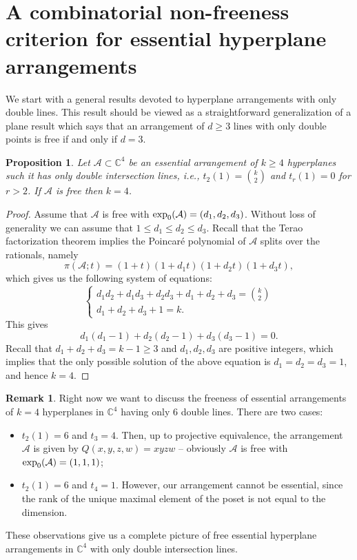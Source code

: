 \documentclass[11pt]{article}
\theoremstyle{plain}
\newtheorem{proposition}[thm]{Proposition}
\theoremstyle{definition}
\newtheorem{remark}[thm]{Remark}
\begin{document}
\section{A combinatorial non-freeness criterion for essential hyperplane arrangements}
We start with a general results devoted to hyperplane arrangements with only double lines. This result should be viewed as a straightforward generalization of a plane result which says that an arrangement of $d\geq 3$ lines with only double points is free if and only if $d=3$. 
\begin{proposition}
\label{gen}
Let $\mathcal{A} \subset \mathbb{C}^{4}$ be an essential arrangement of $k\geq 4$ hyperplanes such it has only double intersection lines, i.e., $t_{2}(1) =\binom{k}{2}$ and $t_{r}(1)=0$ for $r>2$. If $\mathcal{A}$ is free then $k=4$.
\end{proposition}
\begin{proof}
Assume that $\mathcal{A}$ is free with ${\rm exp}_{0}(\mathcal{A}) = (d_{1},d_{2},d_{3})$. Without loss of generality we can assume that $1 \leq d_{1} \leq d_{2} \leq d_{3}$. Recall that the Terao factorization theorem implies the Poincar\'e polynomial of $\mathcal{A}$ splits over the rationals, namely
$$\pi(\mathcal{A};t) = (1+t)(1+d_{1}t)(1+d_{2}t)(1+d_{3}t),$$
which gives us the following system of equations:
$$\begin{cases}
d_{1}d_{2}+d_{1}d_{3}+d_{2}d_{3}+d_{1}+d_{2}+d_{3} = \binom{k}{2}\\
d_{1}+d_{2}+d_{3}+1=k.
\end{cases}$$
This gives
$$d_{1}(d_{1}-1) + d_{2}(d_{2}-1) + d_{3}(d_{3}-1)=0.$$
Recall that $d_{1}+d_{2}+d_{3}=k-1\geq 3$ and $d_{1},d_{2},d_{3}$ are positive integers, which implies that the only possible solution of the above equation is $d_{1}=d_{2}=d_{3}=1$, and hence $k=4$.
\end{proof}
\begin{remark}
Right now we want to discuss the freeness of essential arrangements of $k=4$ hyperplanes in $\mathbb{C}^{4}$ having only $6$ double lines. There are two cases:
\begin{itemize}
\item $t_{2}(1)=6$ and $t_{3}=4$. Then, up to projective equivalence, the arrangement $\mathcal{A}$ is given by $Q(x, y, z, w) = xyzw$ -- obviously $\mathcal{A}$ is free with ${\rm exp}_{0}(\mathcal{A}) = (1,1,1)$;
\item $t_{2}(1)=6$ and $t_{4}=1$. However, our arrangement cannot be essential, since the rank of the unique maximal element of the poset is not equal to the dimension.
\end{itemize}
These observations give us a complete picture of free essential hyperplane arrangements in $\mathbb{C}^{4}$ with only double intersection lines.
\end{remark}
\end{document}
